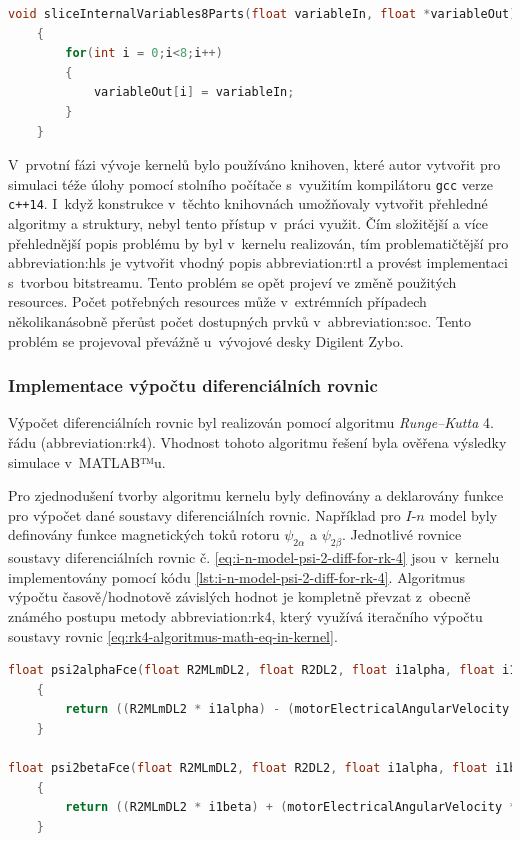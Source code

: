 \documentclass[a4paper, twoside, 11pt]{article}
\begin{document}
		\begin{lstlisting}[language={c++}, caption={Slice funkce pro kopírování proměnné variableIn do pole variableOut s~osmi polohami.}, label={lst:slice-function-8-parts}]
void sliceInternalVariables8Parts(float variableIn, float *variableOut)
	{
		for(int i = 0;i<8;i++)
		{
			variableOut[i] = variableIn;
		}
	}\end{lstlisting}
	V~prvotní fázi vývoje kernelů bylo používáno knihoven, které autor vytvořit pro simulaci téže úlohy pomocí stolního počítače s~využitím kompilátoru \texttt{gcc} verze \texttt{c++14}. I~když konstrukce v~těchto knihovnách umožňovaly vytvořit přehledné algoritmy a struktury, nebyl tento přístup v~práci využit. Čím složitější a více přehlednější popis problému by byl v~kernelu realizován, tím problematičtější pro \gls{abbreviation:hls} je vytvořit vhodný popis \gls{abbreviation:rtl} a provést implementaci s~tvorbou bitstreamu. Tento problém se opět projeví ve změně použitých resources. Počet potřebných resources může v~extrémních případech několikanásobně přerůst počet dostupných prvků v~\gls{abbreviation:soc}. Tento problém se projevoval převážně u~vývojové desky Digilent Zybo.\par

			\subsubsection{Implementace výpočtu diferenciálních rovnic}\label{subsubsec:implementace-vypoctu-diferencialnich-rovnic}
		Výpočet diferenciálních rovnic byl realizován pomocí algoritmu \textit{Runge–Kutta} 4. řádu (\gls{abbreviation:rk4}). Vhodnost tohoto algoritmu řešení byla ověřena výsledky simulace v~MATLAB™u.\par
		Pro zjednodušení tvorby algoritmu kernelu byly definovány a deklarovány funkce pro výpočet dané soustavy diferenciálních rovnic. Například pro $I$-$n$ model byly definovány funkce magnetických toků rotoru $\psi_{2\alpha}$ a $\psi_{2\beta}$. Jednotlivé rovnice soustavy diferenciálních rovnic č. \ref{eq:i-n-model-psi-2-diff-for-rk-4} jsou v~kernelu implementovány pomocí kódu \ref{lst:i-n-model-psi-2-diff-for-rk-4}. Algoritmus výpočtu časově/hodnotově závislých hodnot je kompletně převzat z~obecně známého postupu metody \gls{abbreviation:rk4}, který využívá iteračního výpočtu soustavy rovnic \ref{eq:rk4-algoritmus-math-eq-in-kernel}.

		\begin{lstlisting}[language={c++}, caption={Implementace diferenciálních rovnic č. \ref{eq:i-n-model-psi-2-diff-for-rk-4} do algoritmu kernelu.}, label={lst:i-n-model-psi-2-diff-for-rk-4}]
float psi2alphaFce(float R2MLmDL2, float R2DL2, float i1alpha, float i1beta, float psi2alpha, float psi2beta, float motorElectricalAngularVelocity)
	{
		return ((R2MLmDL2 * i1alpha) - (motorElectricalAngularVelocity * psi2beta) - (R2DL2 * psi2alpha));
	}

float psi2betaFce(float R2MLmDL2, float R2DL2, float i1alpha, float i1beta, float psi2alpha, float psi2beta, float motorElectricalAngularVelocity)
    {
        return ((R2MLmDL2 * i1beta) + (motorElectricalAngularVelocity * psi2alpha) - (R2DL2 * psi2beta));
    }\end{lstlisting}
\end{document}

